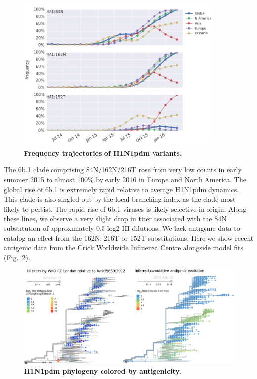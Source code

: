 \documentclass[11pt,oneside,letterpaper]{article}
\begin{document}
\begin{figure}[h!]
	\centering		
	\includegraphics[width=0.9\textwidth]{../figures/feb-2016/H1N1pdm_mutations.png}
	\caption{\textbf{Frequency trajectories of H1N1pdm variants.} 
	}
	\label{H1N1pdm_mutations}
\end{figure}

The 6b.1 clade comprising 84N/162N/216T rose from very low counts in early summer 2015 to almost 100\% by early 2016 in Europe and North America. The global rise of 6b.1 is extremely rapid relative to average H1N1pdm dynamics. This clade is also singled out by the local branching index \cite{neher2014predicting} as the clade most likely to persist. The rapid rise of 6b.1 viruses is likely selective in origin. Along these lines, we observe a very slight drop in titer associated with the 84N substitution of approximately 0.5 log2 HI dilutions. We lack antigenic data to catalog an effect from the 162N, 216T or 152T substitutions. Here we show recent antigenic data from the Crick Worldwide Influenza Centre alongside model fits \cite{neher2015prediction} (Fig.\ \ref{H1N1pdm_HI}).

\begin{figure}[h!]
	\centering		
	\includegraphics[width=1.0\textwidth]{../figures/feb-2016/H1N1pdm_HI.png}
	\caption{\textbf{H1N1pdm phylogeny colored by antigenicity.} 
	}
	\label{H1N1pdm_HI}
\end{figure}
\end{document}
